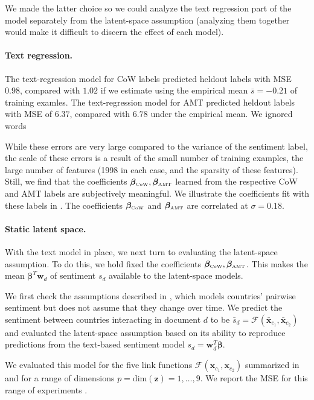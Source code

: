 We made the latter choice so we could analyze the text regression part
of the model separately from the latent-space assumption (analyzing
them together would make it difficult to discern the effect of each
model).

\paragraph{Text regression.} The text-regression model for CoW labels
predicted heldout labels with MSE $0.98$, compared with $1.02$ if we
estimate using the empirical mean $\bar s=-0.21$ of training
examles. The text-regression model for AMT predicted heldout labels
with MSE of $6.37$, compared with $6.78$ under the empirical mean.  We
ignored words 

While these errors are very large compared to the variance of the
sentiment label, the scale of these errors is a result of the small
number of training examples, the large number of features (1998 in
each case, and the sparsity of these features).  Still, we find that
the coefficients $\bm \beta_{\mbox{\tiny CoW}}, \bm \beta_{\mbox{\tiny
    AMT}}$ learned from the respective CoW and AMT labels are
subjectively meaningful.  We illustrate the coefficients fit with
these labels in .  The coefficients $\bm
\beta_{\mbox{\tiny CoW}}$ and $\bm \beta_{\mbox{\tiny AMT}}$ are
correlated at $\sigma=0.18$.

\paragraph{Static latent space.}
With the text model in place, we next turn to evaluating the
latent-space assumption.  To do this, we hold fixed the coefficients
$\bm \beta_{\mbox{\tiny CoW}}, \bm \beta_{\mbox{\tiny AMT}}$.  This
makes the mean $\bm \beta^T \bm w_d$ of sentiment $s_d$ available to
the latent-space models.

We first check the assumptions described in
, which models countries' pairwise
sentiment but does not assume that they change over time.  We predict
the sentiment between countries interacting in document $d$ to be
$\bar s_d = \mathcal{F}(\bm \bar x_{c_1}, \bm \bar x_{c_2})$ and
evaluated the latent-space assumption based on its ability to
reproduce predictions from the text-based sentiment model $s_d = \bm
w_d^T \bm \beta$.

We evaluated this model for the five link functions $\mathcal{F}(\bm
x_{c_1}, \bm x_{c_2})$ summarized in  and for
a range of dimensions $p = \mbox{dim}(\bm z) = 1, \ldots, 9$.  We
report the MSE for this range of experiments
.

